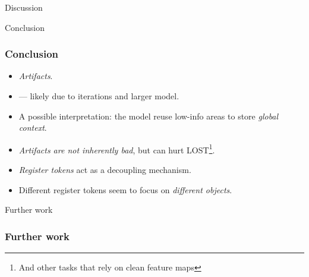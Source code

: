 \documentclass[aspectratio=169]{beamer}
\begin{document}
\begin{section}{Discussion}

\begin{subsection}{Conclusion}

\begin{frame}
\frametitle{Conclusion}
\begin{itemize}
    \item \emph{Artifacts}.
    \item — likely due to iterations and larger model.
    \item A possible interpretation: the model reuse low-info areas to store \emph{global context}.
    \item \emph{Artifacts are not inherently bad}, but can hurt LOST\footnote{And other tasks that rely on clean feature maps}.
    \item \emph{Register tokens} act as a decoupling mechanism.
    \item Different register tokens seem to focus on \emph{different objects}.
\end{itemize}
\end{frame}

\end{subsection}

\begin{subsection}{Further work}

\begin{frame}
\frametitle{Further work}


\end{frame}
\end{subsection}
\end{section}
\end{document}

